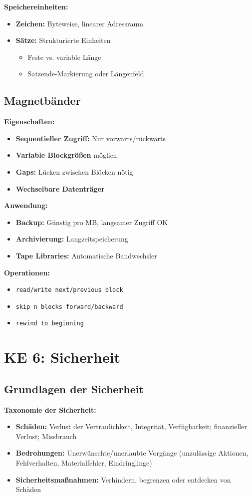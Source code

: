 \documentclass[9pt,a4paper]{extarticle}
\begin{document}
\begin{multicols*}{2}
\textbf{Speichereinheiten:}
\begin{itemize}
\item \textbf{Zeichen:} Byteweise, linearer Adressraum
\item \textbf{Sätze:} Strukturierte Einheiten
  \begin{itemize}
  \item Feste vs. variable Länge
  \item Satzende-Markierung oder Längenfeld
  \end{itemize}
\end{itemize}

\subsection{Magnetbänder}
\textbf{Eigenschaften:}
\begin{itemize}
\item \textbf{Sequentieller Zugriff:} Nur vorwärts/rückwärts
\item \textbf{Variable Blockgrößen} möglich
\item \textbf{Gaps:} Lücken zwischen Blöcken nötig
\item \textbf{Wechselbare Datenträger}
\end{itemize}

\textbf{Anwendung:}
\begin{itemize}
\item \textbf{Backup:} Günstig pro MB, langsamer Zugriff OK
\item \textbf{Archivierung:} Langzeitspeicherung
\item \textbf{Tape Libraries:} Automatische Bandwechsler
\end{itemize}

\textbf{Operationen:}
\begin{itemize}
\item \texttt{read/write next/previous block}
\item \texttt{skip n blocks forward/backward}
\item \texttt{rewind to beginning}
\end{itemize}

\section{KE 6: Sicherheit}

\subsection{Grundlagen der Sicherheit}
\textbf{Taxonomie der Sicherheit:}
\begin{itemize}
\item \textbf{Schäden:} Verlust der Vertraulichkeit, Integrität, Verfügbarkeit; finanzieller Verlust; Missbrauch
\item \textbf{Bedrohungen:} Unerwünschte/unerlaubte Vorgänge (unzulässige Aktionen, Fehlverhalten, Materialfehler, Eindringlinge)
\item \textbf{Sicherheitsmaßnahmen:} Verhindern, begrenzen oder entdecken von Schäden
\end{itemize}


\end{multicols*}
\end{document}
